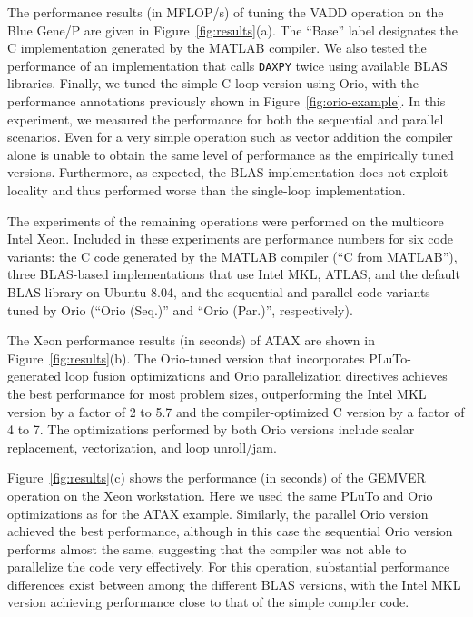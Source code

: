 \documentclass[runningheads]{llncs}
\begin{document}
The performance results (in MFLOP/s) of tuning the VADD operation on the Blue
Gene/P are given in Figure~\ref{fig:results}(a). The ``Base'' label
designates the C implementation generated by the MATLAB compiler. We also
tested the performance of an implementation that calls
\texttt{DAXPY} twice using available BLAS libraries.
Finally, we tuned the simple C loop version using Orio, with the performance
annotations previously shown in Figure~\ref{fig:orio-example}. In this
experiment, we measured the performance for both the sequential and parallel
scenarios. Even for a very simple operation such as vector addition the
compiler alone is unable to obtain the same level of performance as the
empirically tuned versions. Furthermore, as expected, the BLAS implementation
does not exploit locality and thus performed worse than the single-loop
implementation.

The experiments of the remaining operations were performed on the
multicore Intel Xeon. Included in these experiments are performance
numbers for six code variants: the C code generated by the MATLAB
compiler (``C from MATLAB''), three BLAS-based implementations that
use Intel MKL, ATLAS, and the default BLAS library on Ubuntu 8.04, and
the sequential and parallel code variants tuned by Orio (``Orio
(Seq.)'' and ``Orio (Par.)'', respectively).

The Xeon performance results (in seconds) of ATAX are shown in
Figure~\ref{fig:results}(b). The Orio-tuned version that incorporates
PLuTo-generated loop fusion optimizations and Orio parallelization
directives achieves the best performance for most problem sizes,
outperforming the Intel MKL version by a factor of 2 to 5.7 and the
compiler-optimized C version by a factor of 4 to 7. The optimizations
performed by both Orio versions include scalar replacement,
vectorization, and loop unroll/jam.

Figure~\ref{fig:results}(c) shows the performance (in seconds) of the GEMVER
operation on the Xeon workstation. Here we used the same PLuTo and Orio
optimizations as for the ATAX example. Similarly, the parallel Orio version
achieved the best performance, although in this case the sequential Orio
version performs almost the same, suggesting that the compiler was not able
to parallelize the code very effectively. For this operation, substantial
performance differences exist between among the different BLAS versions, with
the Intel MKL version achieving performance close to that of the simple
compiler code.
\end{document}
